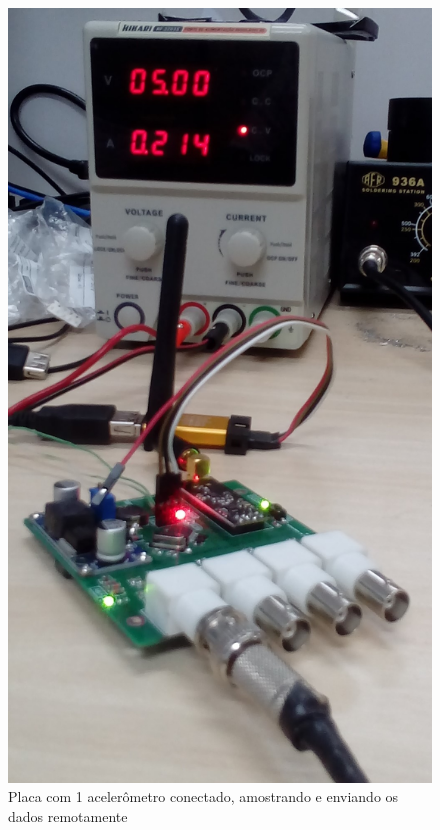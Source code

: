 \documentclass[
	12pt,				%
	openright,			%
	twoside,			%
	a4paper,			%
	english,			%
	french,				%
	spanish,			%
	brazil,				%
	]{abntex2}
\begin{document}
\begin{figure}[H]
\begin{minipage}{0.4\linewidth}
				\includegraphics[width = .92\linewidth]{../Fotos/consumo1.jpg}
				\caption[Placa com 1 acelerômetro]{Placa com 1 acelerômetro conectado, amostrando e enviando os dados remotamente}
			\end{minipage}
		\end{figure}
			
\end{document}
